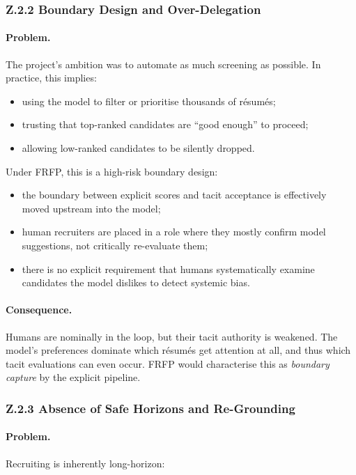 \subsubsection*{Z.2.2 Boundary Design and Over-Delegation}

\paragraph{Problem.}
The project’s ambition was to automate as much screening as possible.
In practice, this implies:

\begin{itemize}
  \item using the model to filter or prioritise thousands of résumés;
  \item trusting that top-ranked candidates are ``good enough'' to proceed;
  \item allowing low-ranked candidates to be silently dropped.
\end{itemize}

Under FRFP, this is a high-risk boundary design:

\begin{itemize}
  \item the boundary between explicit scores and tacit acceptance is
        effectively moved upstream into the model;
  \item human recruiters are placed in a role where they mostly confirm
        model suggestions, not critically re-evaluate them;
  \item there is no explicit requirement that humans systematically examine
        candidates the model dislikes to detect systemic bias.
\end{itemize}

\paragraph{Consequence.}
Humans are nominally in the loop, but their tacit authority is weakened.
The model’s preferences dominate which résumés get attention at all,
and thus which tacit evaluations can even occur.
FRFP would characterise this as \emph{boundary capture} by the explicit
pipeline.

\subsubsection*{Z.2.3 Absence of Safe Horizons and Re-Grounding}

\paragraph{Problem.}
Recruiting is inherently long-horizon:

